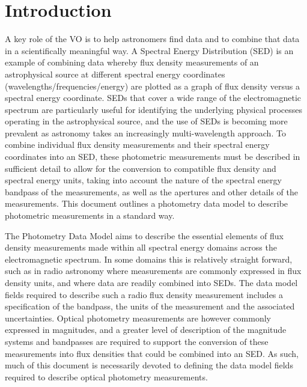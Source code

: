 \documentclass[11pt,a4paper]{ivoa}
\begin{document}
\section{Introduction}
A key role of the VO is to help astronomers find data and to
combine that data in a scientifically meaningful way. A Spectral
Energy Distribution (SED) is an example of combining data whereby
flux density measurements of an astrophysical source at different
spectral energy coordinates (wavelengths/frequencies/energy)
\citep{doi:10.1146/annurev.astro.41.082801.100251,longo,connell,brujine}
are plotted as a
graph of flux density versus a spectral energy coordinate. SEDs that
cover a wide range of the electromagnetic spectrum are particularly
useful for identifying the underlying physical processes operating
in the astrophysical source, and the use of SEDs is becoming more
prevalent as astronomy takes an increasingly multi-wavelength
approach. To combine individual flux density measurements and their
spectral energy coordinates into an SED, these photometric measurements
must be described in sufficient detail to allow for the conversion to
compatible flux density and spectral energy units,  taking into
account the nature of the spectral energy bandpass of the measurements,
as well as the apertures and other details of  the measurements.
This document outlines a photometry data model to describe photometric
measurements in a standard way.

The Photometry Data Model aims to describe the essential elements
of flux density measurements made within all spectral energy domains
across the electromagnetic spectrum. In some domains this is
relatively straight forward, such as in radio astronomy where
measurements are commonly expressed in flux density units, and
where data are readily combined into SEDs. The data model fields
required to describe such a radio flux density measurement includes
a specification of the bandpass, the units of the measurement and
the associated uncertainties. Optical photometry measurements are
however commonly expressed in magnitudes, and a greater level of
description of the magnitude systems and bandpasses are required
to support the conversion of these measurements into flux densities
that could be combined into an SED. As such, much of this document
is necessarily devoted to defining the data model fields required
to describe optical photometry measurements.
\end{document}
